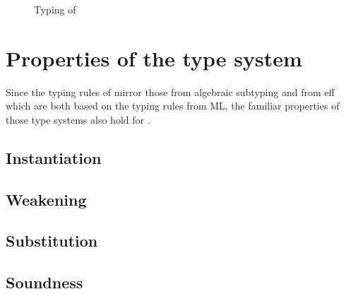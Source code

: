 \begin{figure}[!htb]
\begin{center}
{\begin{minipage}{0.95\columnwidth}
\begin{mathpar}





\end{mathpar}
\end{minipage}
}
\end{center}
\caption{Typing of \core}\label{fig:core-typing}
\end{figure}

\section{Properties of the type system}
Since the typing rules of \core mirror those from algebraic subtyping and from eff which are both based on the typing rules from ML, the familiar properties of those type systems also hold for \core.

\subsection{Instantiation}

\subsection{Weakening}

\subsection{Substitution}

\subsection{Soundness}
